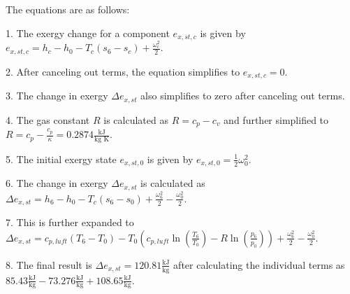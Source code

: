The equations are as follows:

1. The exergy change for a component \( e_{x,st,c} \) is given by \( e_{x,st,c} = h_c - h_0 - T_c(s_6 - s_c) + \frac{\omega_c^2}{2} \).

2. After canceling out terms, the equation simplifies to \( e_{x,st,c} = 0 \).

3. The change in exergy \( \Delta e_{x,st} \) also simplifies to zero after canceling out terms.

4. The gas constant \( R \) is calculated as \( R = c_p - c_v \) and further simplified to \( R = c_p - \frac{c_p}{\kappa} = 0.2874 \frac{\text{kJ}}{\text{kg K}} \).

5. The initial exergy state \( e_{x,st,0} \) is given by \( e_{x,st,0} = \frac{1}{2} \omega_0^2 \).

6. The change in exergy \( \Delta e_{x,st} \) is calculated as \( \Delta e_{x,st} = h_6 - h_0 - T_c(s_6 - s_0) + \frac{\omega_6^2}{2} - \frac{\omega_0^2}{2} \).

7. This is further expanded to \( \Delta e_{x,st} = c_{p,luft}(T_6 - T_0) - T_0 \left( c_{p,luft} \ln \left( \frac{T_6}{T_0} \right) - R \ln \left( \frac{p_6}{p_0} \right) \right) + \frac{\omega_6^2}{2} - \frac{\omega_0^2}{2} \).

8. The final result is \( \Delta e_{x,st} = 120.81 \frac{\text{kJ}}{\text{kg}} \) after calculating the individual terms as \( 85.43 \frac{\text{kJ}}{\text{kg}} - 73.276 \frac{\text{kJ}}{\text{kg}} + 108.65 \frac{\text{kJ}}{\text{kg}} \).